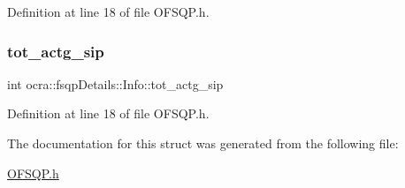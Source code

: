 Definition at line 18 of file O\+F\+S\+Q\+P.\+h.

\hypertarget{structocra_1_1fsqpDetails_1_1Info_ae08ce33371d07fc406b18a9d7b58dabc}{}\label{structocra_1_1fsqpDetails_1_1Info_ae08ce33371d07fc406b18a9d7b58dabc} 
\subsubsection{\texorpdfstring{tot\+\_\+actg\+\_\+sip}{tot\_actg\_sip}}
{\footnotesize\ttfamily int ocra\+::fsqp\+Details\+::\+Info\+::tot\+\_\+actg\+\_\+sip}



Definition at line 18 of file O\+F\+S\+Q\+P.\+h.



The documentation for this struct was generated from the following file\+:\begin{DoxyCompactItemize}
\item 
\hyperlink{OFSQP_8h}{O\+F\+S\+Q\+P.\+h}\end{DoxyCompactItemize}

